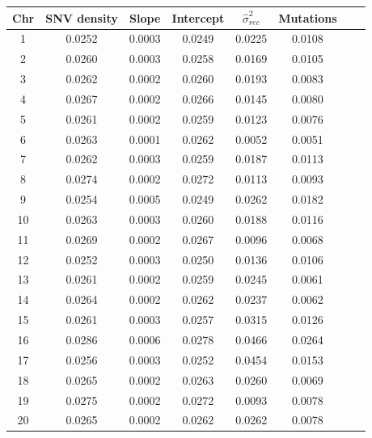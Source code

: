 \documentclass[12pt]{article}%
\begin{document}
\begin{table}[htp!]
\centering
\begin{tabular}{ c c c c c c c c }
\hline
\bf{Chr} & \bf{SNV density} & \bf{Slope} & \bf{Intercept} & \bf{$\hat{\sigma }^2_{rec}$} & \bf{Mutations} \\
\hline
\hline
  1 &      0.0252 & 0.0003 &    0.0249 &                  0.0225 &    0.0108 \\
  2 &      0.0260 & 0.0003 &    0.0258 &                  0.0169 &    0.0105 \\
  3 &      0.0262 & 0.0002 &    0.0260 &                  0.0193 &    0.0083 \\
  4 &      0.0267 & 0.0002 &    0.0266 &                  0.0145 &    0.0080 \\
  5 &      0.0261 & 0.0002 &    0.0259 &                  0.0123 &    0.0076 \\
  6 &      0.0263 & 0.0001 &    0.0262 &                  0.0052 &    0.0051 \\
  7 &      0.0262 & 0.0003 &    0.0259 &                  0.0187 &    0.0113 \\
  8 &      0.0274 & 0.0002 &    0.0272 &                  0.0113 &    0.0093 \\
  9 &      0.0254 & 0.0005 &    0.0249 &                  0.0262 &    0.0182 \\
 10 &      0.0263 & 0.0003 &    0.0260 &                  0.0188 &    0.0116 \\
 11 &      0.0269 & 0.0002 &    0.0267 &                  0.0096 &    0.0068 \\
 12 &      0.0252 & 0.0003 &    0.0250 &                  0.0136 &    0.0106 \\
 13 &      0.0261 & 0.0002 &    0.0259 &                  0.0245 &    0.0061 \\
 14 &      0.0264 & 0.0002 &    0.0262 &                  0.0237 &    0.0062 \\
 15 &      0.0261 & 0.0003 &    0.0257 &                  0.0315 &    0.0126 \\
 16 &      0.0286 & 0.0006 &    0.0278 &                  0.0466 &    0.0264 \\
 17 &      0.0256 & 0.0003 &    0.0252 &                  0.0454 &    0.0153 \\
 18 &      0.0265 & 0.0002 &    0.0263 &                  0.0260 &    0.0069 \\
 19 &      0.0275 & 0.0002 &    0.0272 &                  0.0093 &    0.0078 \\
 20 &      0.0265 & 0.0002 &    0.0262 &                  0.0262 &    0.0078 \\

\end{tabular}
\end{table}
\end{document}
